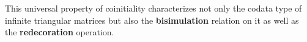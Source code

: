 \documentclass{easychair}
\newcommand{\fat}[1]{\textbf{#1}}
\begin{document}
% 
% 
% 
% 
% 
% 
% 
% 
% 
% 
% 
% 
% 
% 
% 
% 
% 
% 
%   
%    
%    
% 
%    
% 
% 
This universal property of coinitiality characterizes not only the codata type of infinite triangular matrices but also
the \fat{bisimulation} relation on it as well as the \fat{redecoration} operation.
 
\end{document}

